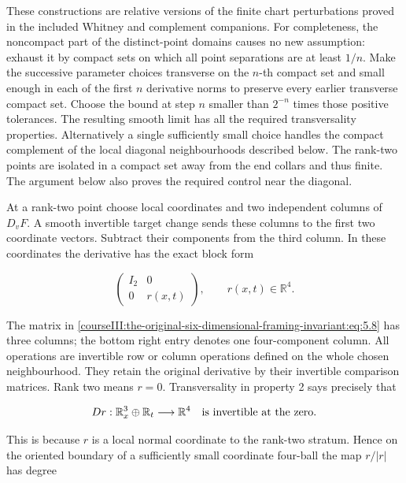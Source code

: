 These constructions are relative versions of the finite chart perturbations proved in the included Whitney and complement companions. For completeness, the noncompact part of the distinct-point domains causes no new assumption: exhaust it by compact sets on which all point separations are at least \(1/n\). Make the successive parameter choices transverse on the \(n\)-th compact set and small enough in each of the first \(n\) derivative norms to preserve every earlier transverse compact set. Choose the bound at step \(n\) smaller than \(2^{-n}\) times those positive tolerances. The resulting smooth limit has all the required transversality properties. Alternatively a single sufficiently small choice handles the compact complement of the local diagonal neighbourhoods described below. The rank-two points are isolated in a compact set away from the end collars and thus finite. The argument below also proves the required control near the diagonal.

At a rank-two point choose local coordinates and two independent columns of \(D_vF\). A smooth invertible target change sends these columns to the first two coordinate vectors. Subtract their components from the third column. In these coordinates the derivative has the exact block form

\begin{equation}
\begin{pmatrix}I_2&0\\0&r(x,t)\end{pmatrix},
       \qquad r(x,t)\in\mathbb R^4.
 \label{courseIII:the-original-six-dimensional-framing-invariant:eq:5.8}
\end{equation}

The matrix in \eqref{courseIII:the-original-six-dimensional-framing-invariant:eq:5.8} has three columns; the bottom right entry denotes one four-component column. All operations are invertible row or column operations defined on the whole chosen neighbourhood. They retain the original derivative by their invertible comparison matrices. Rank two means \(r=0\). Transversality in property 2 says precisely that

\begin{equation}
D r:\mathbb R^3_x\oplus\mathbb R_t\longrightarrow\mathbb R^4
       \quad\hbox{is invertible at the zero.}
 \label{courseIII:the-original-six-dimensional-framing-invariant:eq:5.9}
\end{equation}

This is because \(r\) is a local normal coordinate to the rank-two stratum. Hence on the oriented boundary of a sufficiently small coordinate four-ball the map \(r/|r|\) has degree

